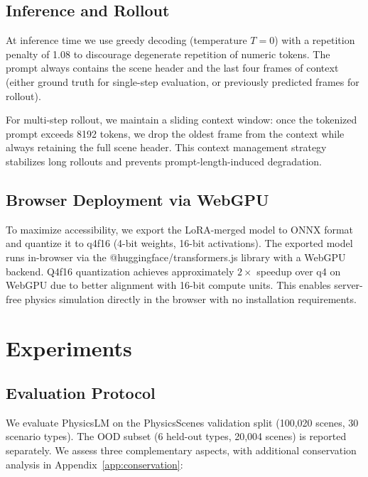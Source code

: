 \documentclass{article}
\begin{document}
\subsection{Inference and Rollout}

At inference time we use greedy decoding (temperature $T=0$) with a repetition
penalty of 1.08 to discourage degenerate repetition of numeric tokens. The prompt
always contains the scene header and the last four frames of context (either ground
truth for single-step evaluation, or previously predicted frames for rollout).

For multi-step rollout, we maintain a sliding context window: once the tokenized
prompt exceeds 8192 tokens, we drop the oldest frame from the context while
always retaining the full scene header. This context management strategy stabilizes
long rollouts and prevents prompt-length-induced degradation.

\subsection{Browser Deployment via WebGPU}

To maximize accessibility, we export the LoRA-merged model to ONNX format and
quantize it to q4f16 (4-bit weights, 16-bit activations). The exported model
runs in-browser via the @huggingface/transformers.js library with a WebGPU
backend. Q4f16 quantization achieves approximately $2\times$ speedup over q4 on
WebGPU due to better alignment with 16-bit compute units. This enables
server-free physics simulation directly in the browser with no installation
requirements.

\section{Experiments}
\label{sec:experiments}

\subsection{Evaluation Protocol}

We evaluate PhysicsLM on the PhysicsScenes validation split (100,020 scenes,
30 scenario types). The OOD subset (6 held-out types, 20,004 scenes) is reported
separately. We assess three complementary aspects, with additional conservation
analysis in Appendix~\ref{app:conservation}:
\end{document}
